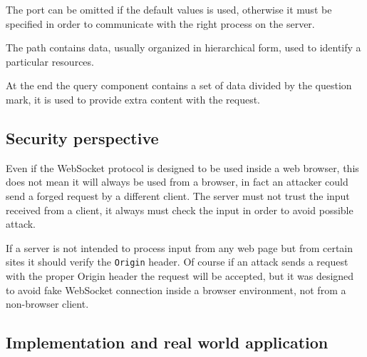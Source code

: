 The port can be omitted if the default values is used, otherwise it must be specified in order to communicate with the right process on the server.\newline

The path contains data, usually organized in hierarchical form, used to identify a particular resources.\newline

At the end the query component contains a set of data divided by the question mark, it is used to provide extra content with the request.\newline

\subsection{Security perspective}
Even if the WebSocket protocol is designed to be used inside a web browser, this does not mean it will always be used from a browser, in fact an attacker could send a forged request by a different client.\newline
The server must not trust the input received from a client, it always must check the input in order to avoid possible attack.\newline

If a server is not intended to process input from any web page but from certain sites it should verify the \texttt{Origin} header.\newline
Of course if an attack sends a request with the proper Origin header the request will be accepted, but it was designed to avoid fake WebSocket connection inside a browser environment, not from a non-browser client.\newline

\subsection{Implementation and real world application}

